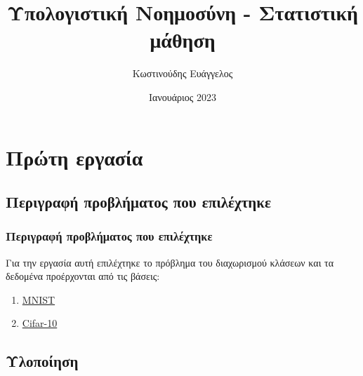 \documentclass{beamer}
\title[Short title] {Υπολογιστική Νοημοσύνη - Στατιστική μάθηση}
\institute
{
    ARISTOTLE UNIVERSITY OF THESSALONIKI \\
    FACULTY OF SCIENCES \\
    SCHOOL OF INFORMATICS \\
    MSC IN ARTIFICIAL INTELLIGENCE
}
\author {Κωστινούδης Ευάγγελος}
\date{Ιανουάριος 2023}
\begin{document}
\begin{frame}

\maketitle

\end{frame}

\section{Πρώτη εργασία}
\subsection{Περιγραφή προβλήματος που επιλέχτηκε}

\begin{frame}
\frametitle{Περιγραφή προβλήματος που επιλέχτηκε}

Για την εργασία αυτή επιλέχτηκε το πρόβλημα του διαχωρισμού κλάσεων και τα
δεδομένα προέρχονται από τις βάσεις:

\begin{enumerate}
\item \href{http://yann.lecun.com/exdb/mnist/}{MNIST}
\item \href{https://www.cs.toronto.edu/~kriz/cifar.html}{Cifar-10}
\end{enumerate}

\end{frame}

\subsection{Υλοποίηση}
\end{document}

